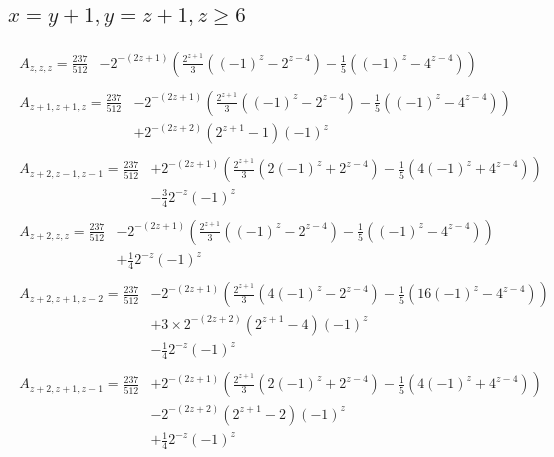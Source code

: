 \newpage
\subsection*{$x=y+1,y=z+1,z\ge6$}
\begin{align*}
\begin{split}
A_{z,z,z}=\frac{237}{512} &-2^{-(2z+1)}\left(\frac{2^{z+1}}{3}\left((-1)^z-2^{z-4}\right)-\frac{1}{5}\left((-1)^z-4^{z-4}\right)\right)
\end{split}\\
\begin{split}
A_{z+1,z+1,z}=\frac{237}{512} &-2^{-(2z+1)}\left(\frac{2^{z+1}}{3}\left((-1)^z-2^{z-4}\right)-\frac{1}{5}\left((-1)^z-4^{z-4}\right)\right)\\
& +2^{-(2z+2)}\left(2^{z+1}-1\right)(-1)^z
\end{split}\\
\begin{split}
A_{z+2,z-1,z-1}=\frac{237}{512} &+2^{-(2z+1)}\left(\frac{2^{z+1}}{3}\left(2(-1)^z+2^{z-4}\right)-\frac{1}{5}\left(4(-1)^z+4^{z-4}\right)\right)\\
& -\frac{3}{4}2^{-z}(-1)^z
\end{split}\\
\begin{split}
A_{z+2,z,z}=\frac{237}{512} &-2^{-(2z+1)}\left(\frac{2^{z+1}}{3}\left((-1)^z-2^{z-4}\right)-\frac{1}{5}\left((-1)^z-4^{z-4}\right)\right)\\
& +\frac{1}{4}2^{-z}(-1)^z
\end{split}\\
\begin{split}
A_{z+2,z+1,z-2}=\frac{237}{512} &-2^{-(2z+1)}\left(\frac{2^{z+1}}{3}\left(4(-1)^z-2^{z-4}\right)-\frac{1}{5}\left(16(-1)^z-4^{z-4}\right)\right)\\
& +3\times2^{-(2z+2)}\left(2^{z+1}-4\right)(-1)^z\\
& -\frac{1}{4}2^{-z}(-1)^z
\end{split}\\
\begin{split}
A_{z+2,z+1,z-1}=\frac{237}{512} &+2^{-(2z+1)}\left(\frac{2^{z+1}}{3}\left(2(-1)^z+2^{z-4}\right)-\frac{1}{5}\left(4(-1)^z+4^{z-4}\right)\right)\\
& -2^{-(2z+2)}\left(2^{z+1}-2\right)(-1)^z\\
& +\frac{1}{4}2^{-z}(-1)^z
\end{split}
\end{align*}

\newpage
